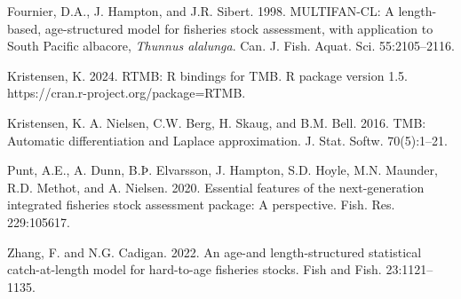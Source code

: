 \documentclass{SCreport}
\begin{document}
\begin{description}\setlength\itemsep{0ex}
  \item Fournier, D.A., J. Hampton, and J.R. Sibert. 1998. MULTIFAN-CL: A
  length-based, age-structured model for fisheries stock assessment, with
  application to South Pacific albacore, \textit{Thunnus alalunga}. Can. J.
  Fish. Aquat. Sci. 55:2105--2116.
  \item Kristensen, K. 2024. RTMB: R bindings for TMB. R package version 1.5.\\
  https://cran.r-project.org/package=RTMB.
  \item Kristensen, K. A. Nielsen, C.W. Berg, H. Skaug, and B.M. Bell. 2016.
  TMB: Automatic differentiation and Laplace approximation. J. Stat. Softw.
  70(5):1--21.
  \item Punt, A.E., A. Dunn, B.Þ. Elvarsson, J. Hampton, S.D. Hoyle, M.N.
  Maunder, R.D. Methot, and A. Nielsen. 2020. Essential features of the
  next-generation integrated fisheries stock assessment package: A perspective.
  Fish. Res. 229:105617.
  \item Zhang, F. and N.G. Cadigan. 2022. An age-and length-structured
  statistical catch-at-length model for hard-to-age fisheries stocks. Fish and
  Fish. 23:1121--1135.
\end{description}
\end{document}
